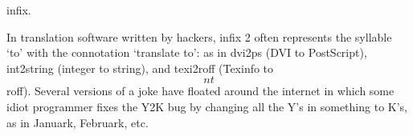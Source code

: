  infix.

In translation software written by hackers, infix 2 often represents the
syllable `to' with the connotation `translate to': as in dvi2ps (DVI to
PostScript), int2string (integer to string), and texi2roff (Texinfo to
\[nt\]roff). Several versions of a joke have floated around the internet
in which some idiot programmer fixes the Y2K bug by changing all the Y's
in something to K's, as in Januark, Februark, etc.

